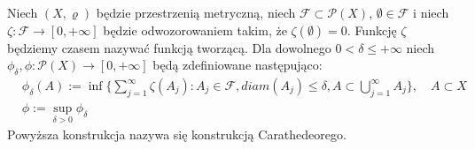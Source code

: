 \begin{defi}
Niech $(X, \varrho)$ będzie przestrzenią metryczną, niech $\mathcal{F} \subset \mathcal{P}(X)$,  $\emptyset \in \mathcal{F}$ i niech \newline
$\zeta: \mathcal{F} \rightarrow [0, +\infty]$ będzie odwozorowaniem takim, że $\zeta(\emptyset) = 0$. Funkcję $\zeta$ będziemy czasem nazywać funkcją tworzącą. Dla dowolnego $0 < \delta \leq +\infty$ niech  $\phi_{\delta}, \phi: \mathcal{P}(X) \rightarrow [0, +\infty]$ będą zdefiniowane następująco: 
\begin{align*}
    &\phi_{\delta}(A) := \inf \{
            \sum_{j=1}^{\infty} \zeta(A_j):
            A_j \in \mathcal{F}, diam(A_j) \leq \delta, A \subset \bigcup_{j=1}^{\infty} A_j
        \},
    \quad 
    A \subset X
    \\
    &\phi := \sup_{\delta > 0} \phi_{\delta}
\end{align*}
Powyższa konstrukcja nazywa się konstrukcją Carathedeorego.

\end{defi}

